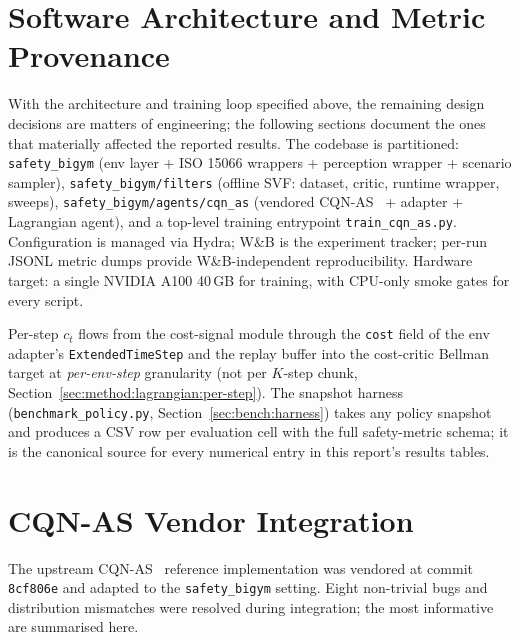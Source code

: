 \documentclass[11pt,a4paper]{report}
\newcommand{\sbigym}{\texttt{safety\_bigym}}
\newcommand{\cqnas}{CQN-AS}
\begin{document}

\section{Software Architecture and Metric Provenance}
\label{sec:impl:arch}
\label{sec:impl:metrics}

With the architecture and training loop specified above, the
remaining design decisions are matters of engineering; the following
sections document the ones that materially affected the reported
results. The codebase is partitioned: \sbigym{} (env layer + ISO 15066
wrappers + perception wrapper + scenario sampler),
\texttt{safety\_bigym/filters} (offline SVF: dataset, critic,
runtime wrapper, sweeps),
\texttt{safety\_bigym/agents/cqn\_as} (vendored
\cqnas{}~\cite{seo2024cqnas} + adapter + Lagrangian agent), and a
top-level training entrypoint \texttt{train\_cqn\_as.py}.
Configuration is managed via Hydra; W\&B is the experiment tracker;
per-run JSONL metric dumps provide W\&B-independent reproducibility.
Hardware target: a single NVIDIA A100 40\,GB for training, with
CPU-only smoke gates for every script.

Per-step $c_t$ flows from the cost-signal module through the
\texttt{cost} field of the env adapter's
\texttt{ExtendedTimeStep} and the replay buffer into the
cost-critic Bellman target at \emph{per-env-step} granularity (not per $K$-step chunk,
Section~\ref{sec:method:lagrangian:per-step}). The snapshot harness
(\texttt{benchmark\_policy.py}, Section~\ref{sec:bench:harness})
takes any policy snapshot and produces a CSV row per evaluation cell
with the full safety-metric schema; it is the canonical source for
every numerical entry in this report's results tables.

\section{\cqnas{} Vendor Integration}
\label{sec:impl:integration}

The upstream \cqnas{}~\cite{seo2024cqnas} reference implementation
was vendored at commit \texttt{8cf806e} and adapted to the
\sbigym{} setting. Eight non-trivial bugs and distribution
mismatches were resolved during integration; the most informative
are summarised here.
\end{document}
